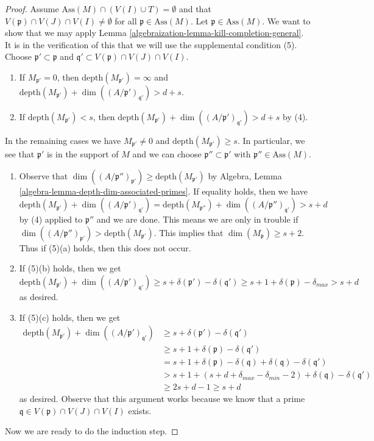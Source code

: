 \begin{proof}
\medskip\noindent
Assume $\text{Ass}(M) \cap (V(I) \cup T) = \emptyset$ and that
$V(\mathfrak p) \cap V(J) \cap V(I) \not = \emptyset$
for all $\mathfrak p \in \text{Ass}(M)$.
Let $\mathfrak p \in \text{Ass}(M)$. We want to show that we may apply
Lemma \ref{algebraization-lemma-kill-completion-general}.
It is in the verification of this that we will use the supplemental
condition (5). Choose $\mathfrak p' \subset \mathfrak p$
and $\mathfrak q' \subset V(\mathfrak p) \cap V(J) \cap V(I)$.
\begin{enumerate}
\item If $M_{\mathfrak p'} = 0$, then
$\text{depth}(M_{\mathfrak p'}) = \infty$ and
$\text{depth}(M_{\mathfrak p'}) +
\dim((A/\mathfrak p')_{\mathfrak q'}) > d + s$.
\item If $\text{depth}(M_{\mathfrak p'}) < s$, then
$\text{depth}(M_{\mathfrak p'}) +
\dim((A/\mathfrak p')_{\mathfrak q'}) > d + s$ by (4).
\end{enumerate}
In the remaining cases we have $M_{\mathfrak p'} \not = 0$ and
$\text{depth}(M_{\mathfrak p'}) \geq s$. In particular, we see that
$\mathfrak p'$ is in the support of $M$ and we can choose
$\mathfrak p'' \subset \mathfrak p'$ with $\mathfrak p'' \in \text{Ass}(M)$.
\begin{enumerate}
\item[(a)] Observe that
$\dim((A/\mathfrak p'')_{\mathfrak p'}) \geq \text{depth}(M_{\mathfrak p'})$
by Algebra, Lemma \ref{algebra-lemma-depth-dim-associated-primes}.
If equality holds, then we have
$$
\text{depth}(M_{\mathfrak p'}) + \dim((A/\mathfrak p')_{\mathfrak q'}) =
\text{depth}(M_{\mathfrak p''}) + \dim((A/\mathfrak p'')_{\mathfrak q'})
> s + d
$$
by (4) applied to $\mathfrak p''$ and we are done. This means we are
only in trouble if
$\dim((A/\mathfrak p'')_{\mathfrak p'}) > \text{depth}(M_{\mathfrak p'})$.
This implies that $\dim(M_\mathfrak p) \geq s + 2$.
Thus if (5)(a) holds, then this does not occur.
\item[(b)] If (5)(b) holds, then we get
$$
\text{depth}(M_{\mathfrak p'}) + \dim((A/\mathfrak p')_{\mathfrak q'})
\geq s + \delta(\mathfrak p') - \delta(\mathfrak q')
\geq s + 1 + \delta(\mathfrak p) - \delta_{max}
> s + d
$$
as desired.
\item[(c)] If (5)(c) holds, then we get
\begin{align*}
\text{depth}(M_{\mathfrak p'}) + \dim((A/\mathfrak p')_{\mathfrak q'})
& \geq
s + \delta(\mathfrak p') - \delta(\mathfrak q') \\
& \geq
s + 1 + \delta(\mathfrak p) - \delta(\mathfrak q') \\
& =
s + 1 + \delta(\mathfrak p) - \delta(\mathfrak q) +
\delta(\mathfrak q) - \delta(\mathfrak q') \\
& >
s + 1 + (s + d + \delta_{max} - \delta_{min} - 2) +
\delta(\mathfrak q) - \delta(\mathfrak q') \\
& \geq
2s + d - 1 \geq s + d
\end{align*}
as desired. Observe that this argument works because
we know that a prime $\mathfrak q \in V(\mathfrak p) \cap V(J) \cap V(I)$
exists.
\end{enumerate}
Now we are ready to do the induction step.


\end{proof}
